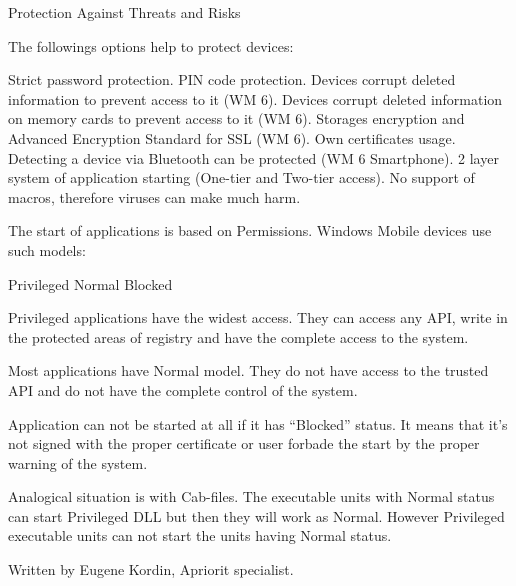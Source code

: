 Protection Against Threats and Risks

The followings options help to protect devices:

Strict password protection. PIN code protection. Devices corrupt deleted
information to prevent access to it (WM 6). Devices corrupt deleted information
on memory cards to prevent access to it (WM 6). Storages encryption and Advanced
Encryption Standard for SSL (WM 6). Own certificates usage. Detecting a device
via Bluetooth can be protected (WM 6 Smartphone). 2 layer system of application
starting (One-tier and Two-tier access). No support of macros, therefore viruses
can make much harm.

The start of applications is based on Permissions. Windows Mobile devices use
such models:

Privileged Normal Blocked

Privileged applications have the widest access. They can access any API, write in
the protected areas of registry and have the complete access to the system.

Most applications have Normal model. They do not have access to the trusted API
and do not have the complete control of the system.

Application can not be started at all if it has “Blocked” status. It means that
it’s not signed with the proper certificate or user forbade the start by the
proper warning of the system.

Analogical situation is with Cab-files. The executable units with Normal status
can start Privileged DLL but then they will work as Normal. However Privileged
executable units can not start the units having Normal status.

Written by Eugene Kordin, Apriorit specialist.
